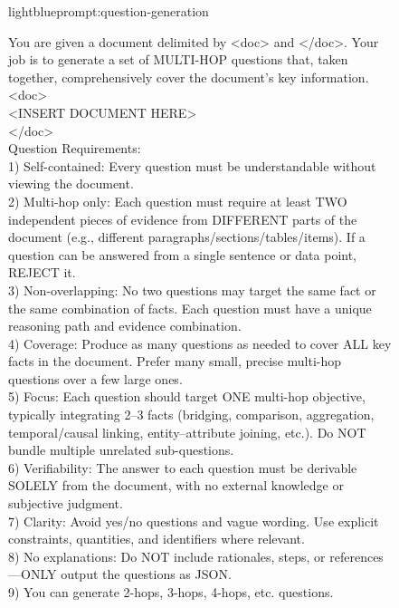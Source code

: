 \documentclass{applemlr}
\numberwithin{equation}{section}
\begin{document}
\begin{figure}[t]
\centering
\begin{minipage}{0.95\textwidth}
\begin{promptbox}[\color{black}{Prompt for Complex Question Generation}]{lightblue}{prompt:question-generation}
\label{temp:question_generation_prompt}

\ttfamily

You are given a document delimited by <doc> and </doc>. Your job is to generate a set of MULTI-HOP questions that, taken together, comprehensively cover the document’s key information. \\
<doc> \\
<INSERT DOCUMENT HERE> \\
</doc> \\[4pt]

Question Requirements: \\
1) Self-contained: Every question must be understandable without viewing the document. \\
2) Multi-hop only: Each question must require at least TWO independent pieces of evidence from DIFFERENT parts of the document (e.g., different paragraphs/sections/tables/items). If a question can be answered from a single sentence or data point, REJECT it. \\
3) Non-overlapping: No two questions may target the same fact or the same combination of facts. Each question must have a unique reasoning path and evidence combination. \\
4) Coverage: Produce as many questions as needed to cover ALL key facts in the document. Prefer many small, precise multi-hop questions over a few large ones. \\
5) Focus: Each question should target ONE multi-hop objective, typically integrating 2–3 facts (bridging, comparison, aggregation, temporal/causal linking, entity–attribute joining, etc.). Do NOT bundle multiple unrelated sub-questions. \\
6) Verifiability: The answer to each question must be derivable SOLELY from the document, with no external knowledge or subjective judgment. \\
7) Clarity: Avoid yes/no questions and vague wording. Use explicit constraints, quantities, and identifiers where relevant. \\
8) No explanations: Do NOT include rationales, steps, or references—ONLY output the questions as JSON. \\
9) You can generate 2-hops, 3-hops, 4-hops, etc. questions. \\[6pt]


\end{promptbox}
\end{minipage}
\end{figure}
\end{document}
